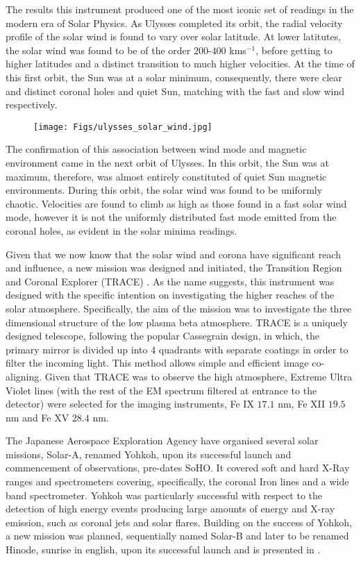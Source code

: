 The results this instrument produced one of the most iconic set of readings in the modern era of Solar Physics.
As Ulysses completed its orbit, the radial velocity profile of the solar wind is found to vary over solar latitude.
At lower latitutes, the solar wind was found to be of the order $200$-$400$ kms$^{-1}$, before getting to higher latitudes and a distinct transition to much higher velocities.
At the time of this first orbit, the Sun was at a solar minimum, consequently, there were clear and distinct coronal holes and quiet Sun, matching with the fast and slow wind respectively.

\begin{figure}
	\texttt{[image: Figs/ulysses\_solar\_wind.jpg]}
	\caption{\cite{McComas2003}}
	\label{fig:ulysses_sw}
\end{figure}

The confirmation of this association between wind mode and magnetic environment came in the next orbit of Ulysses.
In this orbit, the Sun was at maximum, therefore, was almost entirely constituted of quiet Sun magnetic environments.
During this orbit, the solar wind was found to be uniformly chaotic.
Velocities are found to climb as high as those found in a fast solar wind mode, however it is not the uniformly distributed fast mode emitted from the coronal holes, as evident in the solar minima readings.

Given that we now know that the solar wind and corona have significant reach and influence, a new mission was designed and initiated, the Transition Region and Coronal Explorer (TRACE) \cite{Gaeng1998}.
As the name suggests, this instrument was designed with the specific intention on investigating the higher reaches of the solar atmosphere.
Specifically, the aim of the mission was to investigate the three dimensional structure of the low plasma beta atmosphere.
TRACE is a uniquely designed telescope, following the popular Cassegrain design, in which, the primary mirror is divided up into 4 quadrants with separate coatings in order to filter the incoming light.
This method allows simple and efficient image co-aligning.
Given that TRACE was to observe the high atmosphere, Extreme Ultra Violet lines (with the rest of the EM spectrum filtered at entrance to the detector) were selected for the imaging instruments, Fe IX $17.1$ nm, Fe XII $19.5$ nm and Fe XV $28.4$ nm.




The Japanese Aerospace Exploration Agency have organised several solar missions, Solar-A, renamed Yohkoh, \cite{Tsuneta1992} upon its successful launch and commencement of observations, pre-dates SoHO.
It covered soft and hard X-Ray ranges and spectrometers covering, specifically, the coronal Iron lines and a wide band spectrometer. 
Yohkoh was particularly successful with respect to the detection of high energy events producing large amounts of energy and X-ray emission, such as coronal jets and solar flares.
Building on the success of Yohkoh, a new mission was planned, sequentially named Solar-B and later to be renamed Hinode, sunrise in english, upon its successful launch and is presented in \cite{Kosugi2007}.
 
